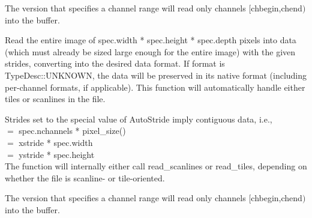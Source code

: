 The version that specifies a channel range will read only
channels $[${\cf chbegin},{\cf chend}$)$ into the buffer.
\apiend



Read the entire image of {\kw spec.width * spec.height * spec.depth}
pixels into data (which must already be sized large enough for
the entire image) with the given strides, converting into the desired
data format.  
If {\cf format} is {\cf TypeDesc::UNKNOWN}, the data will be preserved 
in its native format (including per-channel formats, if applicable).
This function will automatically handle either tiles or scanlines in
the file.

Strides set to the special value of {\kw AutoStride} imply contiguous
data, i.e., \\
 $=$ {\kw spec.nchannels * pixel_size()} \\
 $=$ {\kw xstride * spec.width} \\
 $=$ {\kw ystride * spec.height} \\
The function will internally either call {\kw read_scanlines} or 
{\kw read_tiles}, depending on whether the file is scanline- or
tile-oriented.

The version that specifies a channel range will read only
channels $[${\cf chbegin},{\cf chend}$)$ into the buffer.

